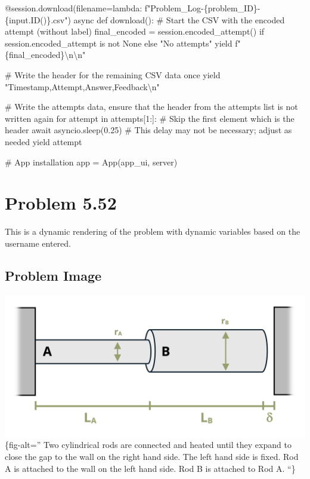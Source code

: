 \documentclass[
  letterpaper,
  DIV=11,
  numbers=noendperiod]{scrreprt}
\newenvironment{Shaded}{\begin{snugshade}}{\end{snugshade}}
\newcommand{\NormalTok}[1]{\textcolor[rgb]{0.00,0.23,0.31}{#1}}
\begin{document}
\begin{Shaded}
\begin{Highlighting}[]
\NormalTok{    @session.download(filename=lambda: f"Problem\_Log{-}\{problem\_ID\}{-}\{input.ID()\}.csv")}
\NormalTok{    async def download():}
\NormalTok{        \# Start the CSV with the encoded attempt (without label)}
\NormalTok{        final\_encoded = session.encoded\_attempt() if session.encoded\_attempt is not None else "No attempts"}
\NormalTok{        yield f"\{final\_encoded\}\textbackslash{}n\textbackslash{}n"}
        
\NormalTok{        \# Write the header for the remaining CSV data once}
\NormalTok{        yield "Timestamp,Attempt,Answer,Feedback\textbackslash{}n"}
        
\NormalTok{        \# Write the attempts data, ensure that the header from the attempts list is not written again}
\NormalTok{        for attempt in attempts[1:]:  \# Skip the first element which is the header}
\NormalTok{            await asyncio.sleep(0.25)  \# This delay may not be necessary; adjust as needed}
\NormalTok{            yield attempt}


\NormalTok{\# App installation}
\NormalTok{app = App(app\_ui, server)}
\end{Highlighting}
\end{Shaded}

\chapter*{Problem 5.52}\label{problem-5.52}


This is a dynamic rendering of the problem with dynamic variables based
on the username entered.

\section*{Problem Image}\label{problem-image-31}


\includegraphics{images/224.png}\{fig-alt='' Two cylindrical rods are
connected and heated until they expand to close the gap to the wall on
the right hand side. The left hand side is fixed. Rod A is attached to
the wall on the left hand side. Rod B is attached to Rod A. ``\}
\end{document}
